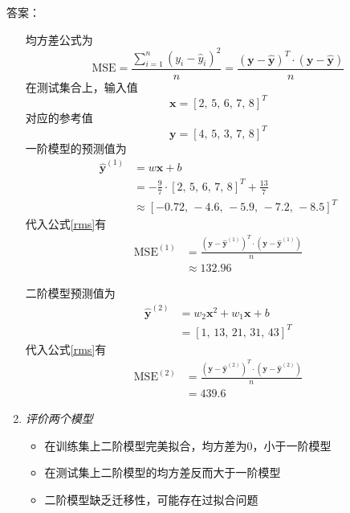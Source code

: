 \documentclass[11pt]{article}
\newenvironment{solution}[1][10cm]{答案：}{}
\newenvironment{solution}[1][10cm]{答案：\vspace{#1}\hide}
    {\endhide}
\renewcommand{\vec}[1]{\bm{#1}}
\newcommand{\Vy}{\vec{y}}
\newcommand{\Vx}{\vec{x}}
\begin{document}
\begin{solution}
\begin{enumerate}[label=(\alph*)]
        均方差公式为
        \begin{equation}\label{rms}
            \textrm{MSE}=\frac{\sum\limits_{i=1}^{n}(y_i-\hat{y}_i)^2}{n}=
            \frac{(\Vy-\hat{\Vy})^T\cdot(\Vy-\hat{\Vy})}{n}
        \end{equation}
        在测试集合上，输入值
        \begin{equation}
            \Vx=\left[2,\,5,\,6,\,7,\,8\right]^T
        \end{equation}
        对应的参考值
        \begin{equation}
            \Vy=\left[4,\,5,\,3,\,7,\,8\right]^T
        \end{equation}
        一阶模型的预测值为
        \begin{equation}
            \begin{split}
            \hat{\Vy}^{(1)}&=w\Vx+b\\
            &=-\frac{9}{7}\cdot\left[2,\,5,\,6,\,7,\,8\right]^T+\frac{13}{7}\\
            &\approx \left[-0.72,\,-4.6,\,-5.9,\,-7.2,\,-8.5\right]^T
            \end{split}
        \end{equation}
        代入公式\ref{rms}有
        \begin{equation}
            \begin{split}
            \textrm{MSE}^{(1)}&=\frac{(\Vy-\hat{\Vy}^{(1)})^T\cdot(\Vy-\hat{\Vy}^{(1)})}{n}\\
            &\approx132.96
            \end{split}
        \end{equation}

        二阶模型预测值为
        \begin{equation}
            \begin{split}
            \hat{\Vy}^{(2)}&=w_2\Vx^2+w_1\Vx+b\\
            &=\left[1,\,13,\,21,\,31,\,43\right]^T
            \end{split}
        \end{equation}
        代入公式\ref{rms}有
        \begin{equation}
            \begin{split}
            \textrm{MSE}^{(2)}&=\frac{(\Vy-\hat{\Vy}^{(2)})^T\cdot(\Vy-\hat{\Vy}^{(2)})}{n}\\
            &= 439.6
            \end{split}
        \end{equation}
        \item \emph{评价两个模型}
        \begin{itemize}
            \item 在训练集上二阶模型完美拟合，均方差为0，小于一阶模型
            \item 在测试集上二阶模型的均方差反而大于一阶模型
            \item 二阶模型缺乏迁移性，可能存在过拟合问题
        \end{itemize}
    \end{enumerate}
\end{solution}
\newpage
\end{document}
